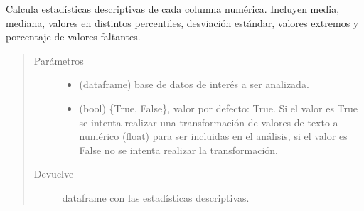 \documentclass[letterpaper,10pt,openany,spanish]{sphinxmanual}
\begin{document}
\begin{fulllineitems}
\label{\detokenize{datos:datos.descriptive_stats}}
Calcula estadísticas descriptivas de cada columna numérica. Incluyen media, mediana, valores en distintos percentiles, desviación estándar, valores extremos y porcentaje de valores faltantes.
\begin{quote}\begin{description}
\item[{Parámetros}] \leavevmode\begin{itemize}
\item {} 
 \textendash{} (dataframe) base de datos de interés a ser analizada.

\item {} 
 \textendash{} (bool) \{True, False\}, valor por defecto: True. Si el valor es True se intenta realizar una transformación de valores de texto a numérico (float) para ser incluidas en el análisis, si el valor es False no se intenta realizar la transformación.

\end{itemize}

\item[{Devuelve}] \leavevmode
dataframe con las estadísticas descriptivas.

\end{description}\end{quote}

\end{fulllineitems}

\end{document}
